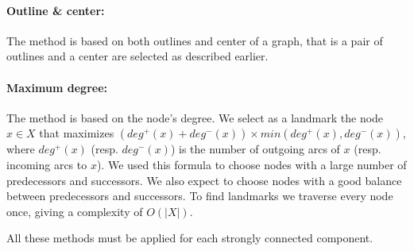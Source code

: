     \paragraph*{Outline \& center:}
The method is based on both outlines and center of a graph, that is a pair of outlines and a center are selected as described earlier. 

    \paragraph*{Maximum degree:}
        The method is based on the node's degree. We select as a landmark the node $x \in X$ that maximizes $(deg^+(x) + deg^-(x)) \times min(deg^+(x), deg^-(x))$, where $deg^+(x)$ (resp. $deg^-(x)$) is the number of outgoing arcs of $x$ (resp. incoming arcs to $x$). We used this formula to choose nodes with a large number of predecessors and successors. We also expect to choose nodes with a good balance between predecessors and successors. 
        To find landmarks we traverse every node once, giving a complexity of $O(|X|)$. 
        
    All these methods must be applied for each strongly connected component.